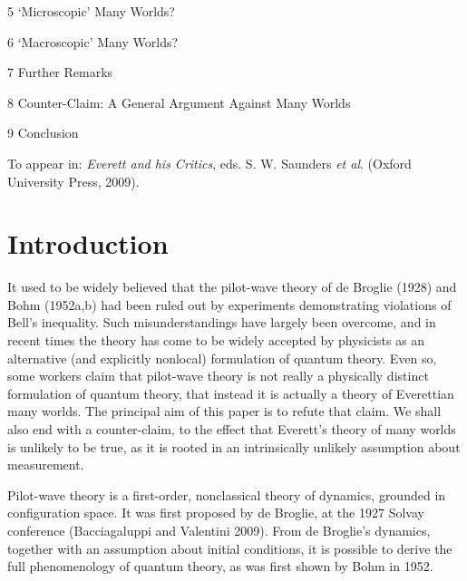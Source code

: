 \documentclass{article}%
\begin{document}
5 `Microscopic' Many Worlds?

6 `Macroscopic' Many Worlds?

7 Further Remarks

8 Counter-Claim: A General Argument Against Many Worlds

9 Conclusion

\bigskip

\bigskip

To appear in: \textit{Everett and his Critics}, eds. S. W. Saunders \textit{et
al}. (Oxford University Press, 2009).

\bigskip

\bigskip

\bigskip

\bigskip

\bigskip

\bigskip

\bigskip

\bigskip

\bigskip

\bigskip

\bigskip

\bigskip

\bigskip\bigskip

\bigskip

\section{Introduction}

It used to be widely believed that the pilot-wave theory of de Broglie (1928)
and Bohm (1952a,b) had been ruled out by experiments demonstrating violations
of Bell's inequality. Such misunderstandings have largely been overcome, and
in recent times the theory has come to be widely accepted by physicists as an
alternative (and explicitly nonlocal) formulation of quantum theory. Even so,
some workers claim that pilot-wave theory is not really a physically distinct
formulation of quantum theory, that instead it is actually a theory of
Everettian many worlds. The principal aim of this paper is to refute that
claim. We shall also end with a counter-claim, to the effect that Everett's
theory of many worlds is unlikely to be true, as it is rooted in an
intrinsically unlikely assumption about measurement.

Pilot-wave theory is a first-order, nonclassical theory of dynamics, grounded
in configuration space. It was first proposed by de Broglie, at the 1927
Solvay conference (Bacciagaluppi and Valentini 2009). From de Broglie's
dynamics, together with an assumption about initial conditions, it is possible
to derive the full phenomenology of quantum theory, as was first shown by Bohm
in 1952.
\end{document}
